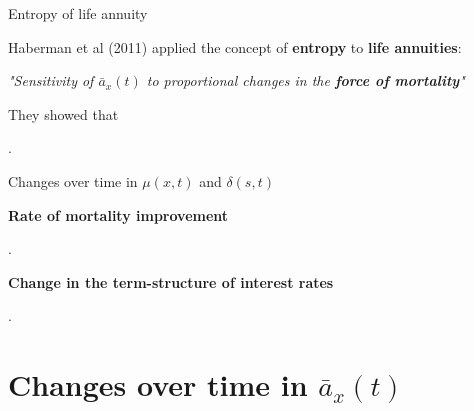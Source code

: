 \documentclass[10pt]{beamer}
\begin{document}
\begin{frame}{Entropy of life annuity}

Haberman et al (2011) applied the concept of \textbf{entropy} to \textbf{life annuities}: \pause

\begin{center}
\end{center}

\begin{center}
\textit{"Sensitivity of $\bar{a}_x(t)$ to proportional changes in the \textbf{force of mortality}"}\pause
\end{center}

They showed that


\begin{center}
	.
\end{center}

\end{frame}



\begin{frame}{Changes over time in $\mu(x,t)$ and $\delta(s,t)$}



\textbf{Rate of mortality improvement}



\begin{center}
	.
\end{center}


\textbf{Change in the term-structure of interest rates}

\begin{center}
	.
\end{center}



\end{frame}






\section{Changes over time in $\bar{a}_x(t)$}
\end{document}
